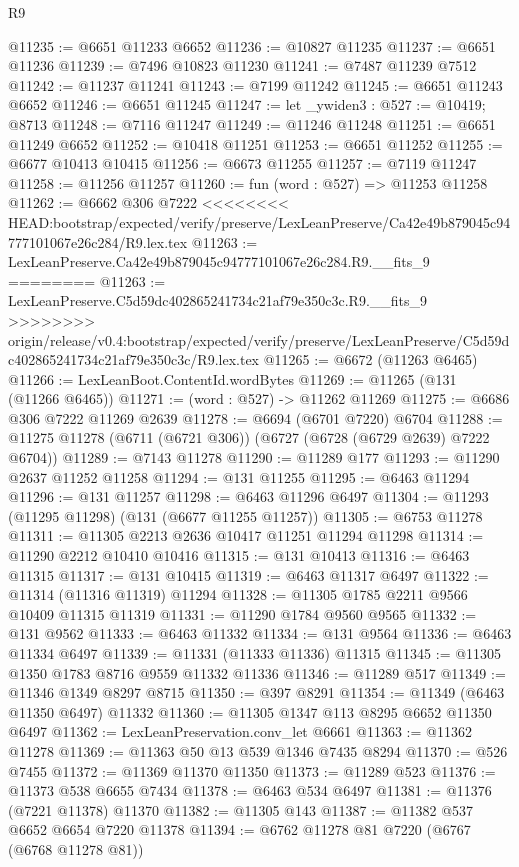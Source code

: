 \begin{lexlean}{R9}
\begin{coremodule}
{{{{{{{{{{{{{{{{{{{{{{{{{{{{{{{{{{{{{{{{{{{{{{{{{{{{{{{{{{{{{{{{{{{{{{{{{{{{{{{{{{{{@11235 := @6651 @11233 @6652
@11236 := @10827 @11235
@11237 := @6651 @11236
@11239 := @7496 @10823 @11230
@11241 := @7487 @11239 @7512
@11242 := @11237 @11241
@11243 := @7199 @11242
@11245 := @6651 @11243 @6652
@11246 := @6651 @11245
@11247 := let _ywiden3 : @527 := @10419; @8713
@11248 := @7116 @11247
@11249 := @11246 @11248
@11251 := @6651 @11249 @6652
@11252 := @10418 @11251
@11253 := @6651 @11252
@11255 := @6677 @10413 @10415
@11256 := @6673 @11255
@11257 := @7119 @11247
@11258 := @11256 @11257
@11260 := fun (word : @527) => @11253 @11258
@11262 := @6662 @306 @7222
<<<<<<<< HEAD:bootstrap/expected/verify/preserve/LexLeanPreserve/Ca42e49b879045c94777101067e26c284/R9.lex.tex
@11263 := LexLeanPreserve.Ca42e49b879045c94777101067e26c284.R9.__fits_9
========
@11263 := LexLeanPreserve.C5d59dc402865241734c21af79e350c3c.R9.__fits_9
>>>>>>>> origin/release/v0.4:bootstrap/expected/verify/preserve/LexLeanPreserve/C5d59dc402865241734c21af79e350c3c/R9.lex.tex
@11265 := @6672 (@11263 @6465)
@11266 := LexLeanBoot.ContentId.wordBytes
@11269 := @11265 (@131 (@11266 @6465))
@11271 := (word : @527) -> @11262 @11269
@11275 := @6686 @306 @7222 @11269 @2639
@11278 := @6694 (@6701 @7220) @6704
@11288 := @11275 @11278 (@6711 (@6721 @306)) (@6727 (@6728 (@6729 @2639) @7222 @6704))
@11289 := @7143 @11278
@11290 := @11289 @177
@11293 := @11290 @2637 @11252 @11258
@11294 := @131 @11255
@11295 := @6463 @11294
@11296 := @131 @11257
@11298 := @6463 @11296 @6497
@11304 := @11293 (@11295 @11298) (@131 (@6677 @11255 @11257))
@11305 := @6753 @11278
@11311 := @11305 @2213 @2636 @10417 @11251 @11294 @11298
@11314 := @11290 @2212 @10410 @10416
@11315 := @131 @10413
@11316 := @6463 @11315
@11317 := @131 @10415
@11319 := @6463 @11317 @6497
@11322 := @11314 (@11316 @11319) @11294
@11328 := @11305 @1785 @2211 @9566 @10409 @11315 @11319
@11331 := @11290 @1784 @9560 @9565
@11332 := @131 @9562
@11333 := @6463 @11332
@11334 := @131 @9564
@11336 := @6463 @11334 @6497
@11339 := @11331 (@11333 @11336) @11315
@11345 := @11305 @1350 @1783 @8716 @9559 @11332 @11336
@11346 := @11289 @517
@11349 := @11346 @1349 @8297 @8715
@11350 := @397 @8291
@11354 := @11349 (@6463 @11350 @6497) @11332
@11360 := @11305 @1347 @113 @8295 @6652 @11350 @6497
@11362 := LexLeanPreservation.conv_let @6661
@11363 := @11362 @11278
@11369 := @11363 @50 @13 @539 @1346 @7435 @8294
@11370 := @526 @7455
@11372 := @11369 @11370 @11350
@11373 := @11289 @523
@11376 := @11373 @538 @6655 @7434
@11378 := @6463 @534 @6497
@11381 := @11376 (@7221 @11378) @11370
@11382 := @11305 @143
@11387 := @11382 @537 @6652 @6654 @7220 @11378
@11394 := @6762 @11278 @81 @7220 (@6767 (@6768 @11278 @81))
}}}}}}}}}}}}}}}}}}}}}}}}}}}}}}}}}}}}}}}}}}}}}}}}}}}}}}}}}}}}}}}}}}}}}}}}}}}}}}}}}}}}
\end{coremodule}
\end{lexlean}
